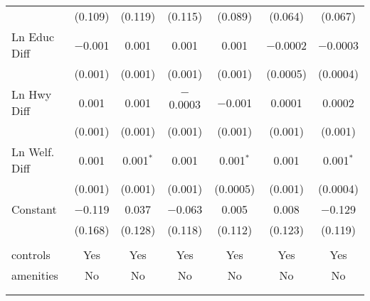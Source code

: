 \begin{table}[!htbp]
\begin{tabular}{@{\extracolsep{5pt}}lcccccc}
  & (0.109) & (0.119) & (0.115) & (0.089) & (0.064) & (0.067) \\ 
  Ln Educ Diff & $-$0.001 & 0.001 & 0.001 & 0.001 & $-$0.0002 & $-$0.0003 \\ 
  & (0.001) & (0.001) & (0.001) & (0.001) & (0.0005) & (0.0004) \\ 
  Ln Hwy Diff & 0.001 & 0.001 & $-$0.0003 & $-$0.001 & 0.0001 & 0.0002 \\ 
  & (0.001) & (0.001) & (0.001) & (0.001) & (0.001) & (0.001) \\ 
  Ln Welf. Diff & 0.001 & 0.001$^{*}$ & 0.001 & 0.001$^{*}$ & 0.001 & 0.001$^{*}$ \\ 
  & (0.001) & (0.001) & (0.001) & (0.0005) & (0.001) & (0.0004) \\ 
  Constant & $-$0.119 & 0.037 & $-$0.063 & 0.005 & 0.008 & $-$0.129 \\ 
  & (0.168) & (0.128) & (0.118) & (0.112) & (0.123) & (0.119) \\ 
 \hline \\[-1.8ex] 
controls & Yes & Yes & Yes & Yes & Yes & Yes \\ 
amenities & No & No & No & No & No & No \\ 
\hline \\[-1.8ex] 
\hline 
\hline \\[-1.8ex] 
\end{tabular} 
\end{table} 
